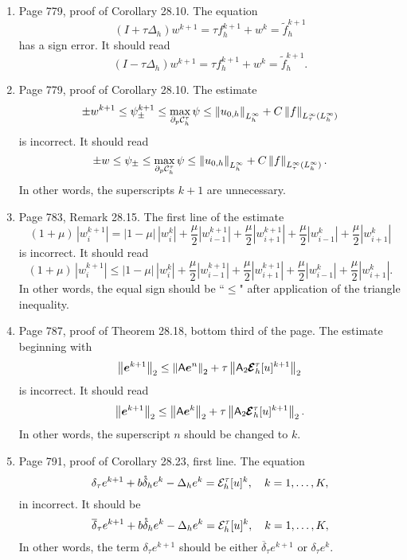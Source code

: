 \documentclass{book}
\begin{document}
	\begin{enumerate}
	\item
Page 779, proof of Corollary 28.10. The equation 
	\[
(I+\tau\Delta_h) w^{k+1} = \tau f_h^{k+1} + w^k = \tilde{f}_h^{k+1}
	\]
has a sign error. It should read
	\[
(I-\tau\Delta_h) w^{k+1} = \tau f_h^{k+1} + w^k = \tilde{f}_h^{k+1}.
	\]
	
	\item
Page 779, proof of Corollary 28.10. The estimate
	\[
\pm w^{k+1} \le \psi_{\pm}^{k+1} \le \max_{\partial_p \mathcal{C}_h^\tau} \psi \le \left\| u_{0,h} \right\|_{L_h^\infty} + C\left\| f \right\|_{L_\tau^\infty(L_h^\infty)}
	\]	
is incorrect. It should read 
	\[
\pm w \le \psi_{\pm} \le \max_{\partial_p \mathcal{C}_h^\tau} \psi \le \left\| u_{0,h} \right\|_{L_h^\infty} + C\left\| f \right\|_{L_\tau^\infty(L_h^\infty)}.
	\]	
In other words, the superscripts ${k+1}$ are unnecessary.

	\item
Page 783, Remark 28.15. The first line of the estimate 
	\[
(1+\mu) \, |w_i^{k+1}| = |1-\mu| \, |w_i^k| + \frac{\mu}{2} | w_{i-1}^{k+1}| + \frac{\mu}{2} |w_{i+1}^{k+1}| + \frac{\mu}{2} | w_{i-1}^k| + \frac{\mu}{2} |w_{i+1}^k| 	
	\]
is incorrect. It should read 
	\[
(1+\mu) \, |w_i^{k+1}| \le  |1-\mu| \, |w_i^k| + \frac{\mu}{2} | w_{i-1}^{k+1}| + \frac{\mu}{2} |w_{i+1}^{k+1}| + \frac{\mu}{2} | w_{i-1}^k| + \frac{\mu}{2} |w_{i+1}^k| 	.
	\]
In other words, the equal sign should be ``$\le$" after application of the triangle inequality.


	\item
Page 787, proof of Theorem 28.18, bottom third of the page. The estimate beginning with 
	\[
\left\| \boldsymbol{e}^{k+1} \right\|_2 \le \left\| \mathsf{A}\boldsymbol{e}^n \right\|_2 +\tau \left\| \mathsf{A}_2\pmb{\mathcal{E}}_h^\tau[u]^{k+1} \right\|_2
	\]
is incorrect. It should read
	\[
\left\| \boldsymbol{e}^{k+1} \right\|_2 \le \left\| \mathsf{A}\boldsymbol{e}^k \right\|_2 +\tau \left\| \mathsf{A}_2\pmb{\mathcal{E}}_h^\tau[u]^{k+1} \right\|_2.
	\]
In other words, the superscript $n$ should be changed to $k$.

	\item
Page 791, proof of Corollary 28.23, first line. The equation
	\[
\delta_\tau e^{k+1} + b \mathring\delta_h e^k - \Delta_h e^k = {\mathcal E}_h^\tau[u]^k, \quad k = 1, \ldots, K,
	\]
in incorrect. It should be
	\[
\overline{\delta}_\tau e^{k+1} + b \mathring\delta_h e^k - \Delta_h e^k = {\mathcal E}_h^\tau[u]^k, \quad k = 1, \ldots, K,
	\]
In other words, the term $\delta_\tau e^{k+1}$ should be either $\overline\delta_\tau e^{k+1}$ or $\delta_\tau e^k$.
	
	\end{enumerate}
	
\end{document}
